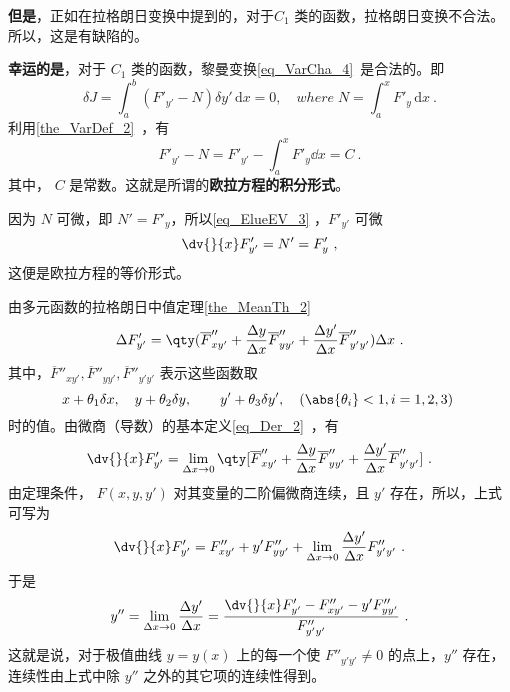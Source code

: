 \textbf{但是}，正如在拉格朗日变换中提到的，对于$C_1$ 类的函数，拉格朗日变换不合法。所以，这是有缺陷的。

\textbf{幸运的是}，对于 $C_1$ 类的函数，黎曼变换\autoref{eq_VarCha_4}~是合法的。即
\begin{equation}
\delta J=\int_a^b \left(F'_{y'}-N \right) \delta y' \,\mathrm{d}{x}=0  ,\quad where \;N=\int_a^xF'_y \,\mathrm{d}{x} ~.
\end{equation}
利用\autoref{the_VarDef_2}~，有
\begin{equation}\label{eq_ElueEV_3}
F'_{y'}-N=F'_{y'}-\int_a^xF'_y\dd x=C~.
\end{equation}
其中， $C$ 是常数。这就是所谓的\textbf{欧拉方程的积分形式}。

因为 $N$ 可微，即 $N'=F'_y$，所以\autoref{eq_ElueEV_3} ，$F'_{y'}$ 可微
\begin{equation}
\dv{}{x}F'_{y'}=N'=F'_y~,
\end{equation}
这便是欧拉方程的等价形式。

由多元函数的拉格朗日中值定理\autoref{the_MeanTh_2}~
\begin{equation}
\Delta F'_{y'}=\qty(\overline{F}''_{xy'}+\frac{\Delta y}{\Delta x}\overline{F}''_{yy'}+\frac{\Delta y'}{\Delta x}\overline{F}''_{y'y'})\Delta x~.
\end{equation}
其中，$\overline{F}''_{xy'},\overline{F}''_{yy'},\overline{F}''_{y'y'}$ 表示这些函数取
\begin{equation}
x+\theta_1\delta x,\quad y+\theta_2\delta y,\quad \quad y'+\theta_3\delta y',\quad (\abs{\theta_i}<1,i=1,2,3)~
\end{equation}
时的值。由微商（导数）的基本定义\autoref{eq_Der_2}~，有
\begin{equation}
\dv{}{x}F'_{y'}=\lim_{\Delta x\rightarrow 0}\qty[\overline{F}''_{xy'}+\frac{\Delta y}{\Delta x}\overline{F}''_{yy'}+\frac{\Delta y'}{\Delta x}\overline{F}''_{y'y'}]~.
\end{equation}
由定理条件， $F(x,y,y')$ 对其变量的二阶偏微商连续，且 $y'$ 存在，所以，上式可写为
\begin{equation}
\dv{}{x}F'_{y'}=F''_{xy'}+y'F''_{yy'}+\lim_{\Delta x\rightarrow0}\frac{\Delta y'}{\Delta x}F''_{y'y'}~.
\end{equation}
于是
\begin{equation}
y''=\lim_{\Delta x\rightarrow0}\frac{\Delta y'}{\Delta x}=\frac{\dv{}{x}F'_{y'}-F''_{xy'}-y'F''_{yy'}}{F''_{y'y'}}~.
\end{equation}
这就是说，对于极值曲线 $y=y(x)$ 上的每一个使 $F''_{y'y'}\neq0$ 的点上，$y''$ 存在，连续性由上式中除 $y''$ 之外的其它项的连续性得到。
